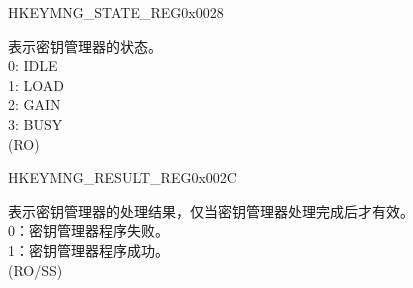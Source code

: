 \begin{register}{H}{KEYMNG\_STATE\_REG}{0x0028}\label{regdesc:KEYMNGSTATEREG}
%
%
\regnewline%
\begin{regdesc}\begin{reglist}
\label{fielddesc:KEYMNGSTATE}\item [KEYMNG\_STATE] 表示密钥管理器的状态。\\
0: IDLE\\
1: LOAD\\
2: GAIN\\
3: BUSY\\
(RO)
\end{reglist}\end{regdesc}
\end{register}


\begin{register}{H}{KEYMNG\_RESULT\_REG}{0x002C}\label{regdesc:KEYMNGRESULTREG}
%
%
\regnewline%
\begin{regdesc}\begin{reglist}
\label{fielddesc:KEYMNGPROCRESULT}\item [KEYMNG\_PROC\_RESULT]  表示密钥管理器的处理结果，仅当密钥管理器处理完成后才有效。\\
0：密钥管理器程序失败。\\
1：密钥管理器程序成功。\\
(RO/SS)
\end{reglist}\end{regdesc}
\end{register}


